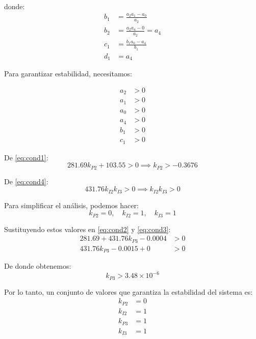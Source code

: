 {donde:
\begin{align}
b_1 &= \frac{a_2a_1 - a_0}{a_2} \label{eq:b1} \\
b_2 &= \frac{a_2a_4 - 0}{a_2} = a_4 \label{eq:b2} \\
c_1 &= \frac{b_1a_0 - a_4}{b_1} \label{eq:c1} \\
d_1 &= a_4 \label{eq:d1}
\end{align}

Para garantizar estabilidad, necesitamos:

\begin{align}
a_2 &> 0 \label{eq:cond1} \\
a_1 &> 0 \label{eq:cond2} \\
a_0 &> 0 \label{eq:cond3} \\
a_4 &> 0 \label{eq:cond4} \\
b_1 &> 0 \label{eq:cond5} \\
c_1 &> 0 \label{eq:cond6}
\end{align}

De \eqref{eq:cond1}:
\begin{equation}
281.69k_{P2} + 103.55 > 0 \implies k_{P2} > -0.3676 \label{eq:kp2_cond}
\end{equation}

De \eqref{eq:cond4}:
\begin{equation}
431.76k_{I2}k_{I3} > 0 \implies k_{I2}k_{I3} > 0 \label{eq:ki_cond}
\end{equation}

Para simplificar el análisis, podemos hacer:
\begin{equation}
k_{P2} = 0, \quad k_{I2} = 1, \quad k_{I3} = 1 \label{eq:k_values}
\end{equation}

Sustituyendo estos valores en \eqref{eq:cond2} y \eqref{eq:cond3}:
\begin{align}
281.69 + 431.76k_{P3} - 0.0004 &> 0 \label{eq:kp3_cond1} \\
431.76k_{P3} - 0.0015 + 0 &> 0 \label{eq:kp3_cond2}
\end{align}

De donde obtenemos:
\begin{equation}
k_{P3} > 3.48\times10^{-6} \label{eq:kp3_final_cond}
\end{equation}

Por lo tanto, un conjunto de valores que garantiza la estabilidad del sistema es:
\begin{align}
k_{P2} &= 0 \label{eq:kp2_final} \\
k_{I2} &= 1 \label{eq:ki2_final} \\
k_{P3} &= 1 \label{eq:kp3_final} \\
k_{I3} &= 1 \label{eq:ki3_final}
\end{align}

}
